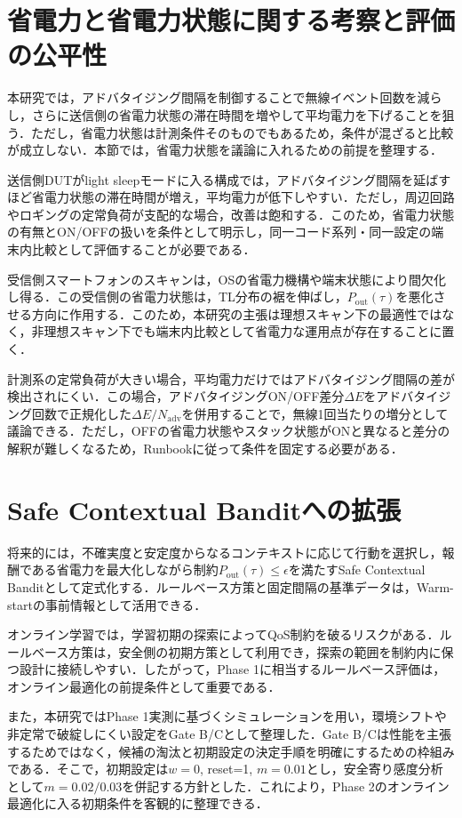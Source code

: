 \section{省電力と省電力状態に関する考察と評価の公平性}
本研究では，アドバタイジング間隔を制御することで無線イベント回数を減らし，さらに送信側の省電力状態の滞在時間を増やして平均電力を下げることを狙う．ただし，省電力状態は計測条件そのものでもあるため，条件が混ざると比較が成立しない．本節では，省電力状態を議論に入れるための前提を整理する．

送信側DUTがlight sleepモードに入る構成では，アドバタイジング間隔を延ばすほど省電力状態の滞在時間が増え，平均電力が低下しやすい．ただし，周辺回路やロギングの定常負荷が支配的な場合，改善は飽和する．このため，省電力状態の有無とON/OFFの扱いを条件として明示し，同一コード系列・同一設定の端末内比較として評価することが必要である．

受信側スマートフォンのスキャンは，OSの省電力機構や端末状態により間欠化し得る．この受信側の省電力状態は，TL分布の裾を伸ばし，$P_{\mathrm{out}}(\tau)$を悪化させる方向に作用する．このため，本研究の主張は理想スキャン下の最適性ではなく，非理想スキャン下でも端末内比較として省電力な運用点が存在することに置く．

計測系の定常負荷が大きい場合，平均電力だけではアドバタイジング間隔の差が検出されにくい．この場合，アドバタイジングON/OFF差分$\Delta E$をアドバタイジング回数で正規化した$\Delta E/N_{\mathrm{adv}}$を併用することで，無線1回当たりの増分として議論できる．ただし，OFFの省電力状態やスタック状態がONと異なると差分の解釈が難しくなるため，Runbookに従って条件を固定する必要がある．

\section{Safe Contextual Banditへの拡張}
将来的には，不確実度と安定度からなるコンテキストに応じて行動を選択し，報酬である省電力を最大化しながら制約$P_{\mathrm{out}}(\tau)\le\epsilon$を満たすSafe Contextual Banditとして定式化する．ルールベース方策と固定間隔の基準データは，Warm-startの事前情報として活用できる．

オンライン学習では，学習初期の探索によってQoS制約を破るリスクがある．ルールベース方策は，安全側の初期方策として利用でき，探索の範囲を制約内に保つ設計に接続しやすい．したがって，Phase 1に相当するルールベース評価は，オンライン最適化の前提条件として重要である．

また，本研究ではPhase 1実測に基づくシミュレーションを用い，環境シフトや非定常で破綻しにくい設定をGate B/Cとして整理した．Gate B/Cは性能を主張するためではなく，候補の淘汰と初期設定の決定手順を明確にするための枠組みである．そこで，初期設定は$w=0$, reset=1, $m=0.01$とし，安全寄り感度分析として$m=0.02/0.03$を併記する方針とした．これにより，Phase 2のオンライン最適化に入る初期条件を客観的に整理できる．

